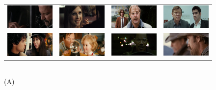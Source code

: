 \begin{figure}
\begin{center}
\begin{tabular}{cccc}
\includegraphics[width=0.15\linewidth]
  {fig/close-ups/09.jpg} 
& \includegraphics[width=0.15\linewidth]
  {fig/close-ups/04.jpg}  
& \includegraphics[width=0.15\linewidth]
  {fig/close-ups/11.jpg}   
& \includegraphics[width=0.15\linewidth]
  {fig/close-ups/12.jpg}
\\
\includegraphics[width=0.15\linewidth]
  {fig/close-ups/13.jpg} 
& \includegraphics[width=0.15\linewidth]
  {fig/close-ups/14.jpg}  
& \includegraphics[width=0.15\linewidth]
  {fig/close-ups/03.jpg}   
& \includegraphics[width=0.15\linewidth]
  {fig/close-ups/16.jpg}
\\
\end{tabular}
\\
\large{(A)}
\\
\bigskip


\end{center}
\end{figure}
